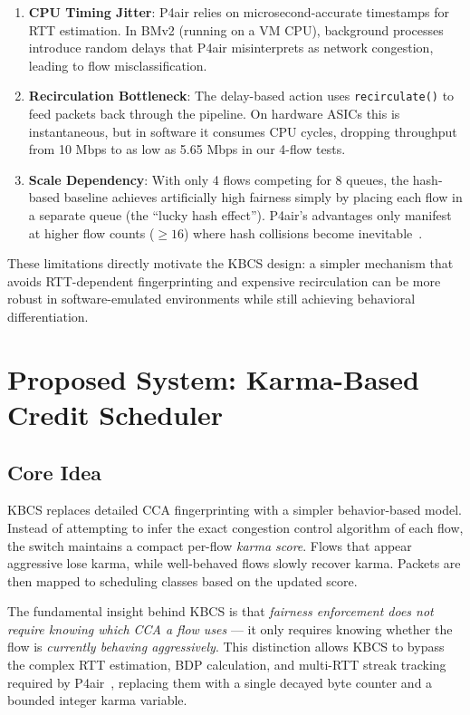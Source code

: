 \documentclass[12pt,a4paper]{report}
\begin{document}
\begin{enumerate}
    \item \textbf{CPU Timing Jitter}: P4air relies on microsecond-accurate timestamps for RTT estimation. In BMv2 (running on a VM CPU), background processes introduce random delays that P4air misinterprets as network congestion, leading to flow misclassification.
    
    \item \textbf{Recirculation Bottleneck}: The delay-based action uses \texttt{recirculate()} to feed packets back through the pipeline. On hardware ASICs this is instantaneous, but in software it consumes CPU cycles, dropping throughput from 10 Mbps to as low as 5.65 Mbps in our 4-flow tests.
    
    \item \textbf{Scale Dependency}: With only 4 flows competing for 8 queues, the hash-based baseline achieves artificially high fairness simply by placing each flow in a separate queue (the ``lucky hash effect''). P4air's advantages only manifest at higher flow counts ($\geq 16$) where hash collisions become inevitable~\cite{repo}.
\end{enumerate}

These limitations directly motivate the KBCS design: a simpler mechanism that avoids RTT-dependent fingerprinting and expensive recirculation can be more robust in software-emulated environments while still achieving behavioral differentiation.

\chapter{Proposed System: Karma-Based Credit Scheduler}

\section{Core Idea}
KBCS replaces detailed CCA fingerprinting with a simpler behavior-based model. Instead of attempting to infer the exact congestion control algorithm of each flow, the switch maintains a compact per-flow \textit{karma score}. Flows that appear aggressive lose karma, while well-behaved flows slowly recover karma. Packets are then mapped to scheduling classes based on the updated score.

The fundamental insight behind KBCS is that \textit{fairness enforcement does not require knowing which CCA a flow uses} — it only requires knowing whether the flow is \textit{currently behaving aggressively}. This distinction allows KBCS to bypass the complex RTT estimation, BDP calculation, and multi-RTT streak tracking required by P4air~\cite{p4air}, replacing them with a single decayed byte counter and a bounded integer karma variable.
\end{document}
